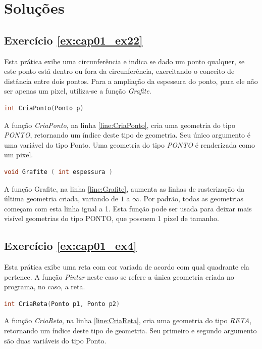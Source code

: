 \section*{Soluções}

\subsection*{Exercício \ref{ex:cap01_ex22}}

Esta prática exibe uma circunferência e indica se dado um ponto qualquer, se este ponto está dentro ou fora da circunferência, exercitando o conceito de distância entre dois pontos. Para a ampliação da espessura do ponto, para ele não ser apenas um pixel, utiliza-se a função \emph{Grafite}.



\begin{lstlisting}[label={func:CriaReta},language=C++]
int CriaPonto(Ponto p)
\end{lstlisting}
A função \emph{CriaPonto}, na linha \ref{line:CriaPonto}, cria uma geometria do tipo \emph{PONTO}, retornando um índice deste tipo de geometria. Seu único argumento é uma variável do tipo Ponto. Uma geometria do tipo \emph{PONTO} é renderizada como um pixel.

\begin{lstlisting}[label={func:Grafite},language=C++]
void Grafite ( int espessura )
\end{lstlisting}
A função Grafite, na linha \ref{line:Grafite}, aumenta as linhas de rasterização da última geometria criada, variando de $1$ a $\infty$. Por padrão, todas as geometrias começam com esta linha igual a 1. Esta função pode ser usada para deixar mais visível geometrias do tipo PONTO, que possuem 1 pixel de tamanho.

\subsection*{Exercício \ref{ex:cap01_ex4}}
Esta prática exibe uma reta com cor variada de acordo com qual quadrante ela pertence. A função \emph{Pintar} neste caso se refere a única geometria criada no programa, no caso, a reta.


\begin{lstlisting}[label={func:CriaReta},language=C++]
int CriaReta(Ponto p1, Ponto p2)
\end{lstlisting}
A função \emph{CriaReta}, na linha \ref{line:CriaReta}, cria uma geometria do tipo \emph{RETA}, retornando um índice deste tipo de geometria. Seu primeiro e segundo argumento são duas variáveis do tipo Ponto.

